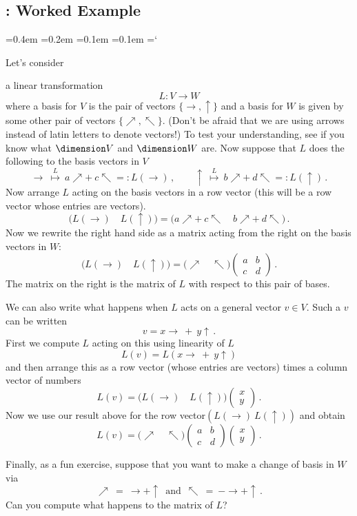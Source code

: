 
\subsection{\eigenTitle: Worked Example}

{\ttfamily
{}\font=0.4em
\font=0.2em
\font=0.1em
\font=0.1em
\hyphenchar\font=`\-


\hypertarget{scripts_eigenvalseigenvects_matrix}{Let's consider} a linear transformation 
\[L:V\longrightarrow W\]
where a basis for $V$ is the pair of vectors $\{\to,\uparrow\}$
and a basis for $W$ is given by some other pair of vectors $\{\nearrow,\nwarrow\}$. (Don't be afraid that we are using arrows instead of latin letters to denote vectors!) To test your understanding, see if you know what $\dimension V$ and $\dimension W$ are. Now suppose that $L$ does the 
following to the basis vectors in $V$
\[
\to \ \stackrel{L}\mapsto\  a\nearrow + \ c\nwarrow =: L(\to)\, ,\qquad \uparrow \ \stackrel{L}\mapsto \ 
b\nearrow +\  d\nwarrow=: L(\uparrow)\, .
\]
Now arrange $L$ acting on the basis vectors in a row vector (this will be a row vector whose entries are vectors).
\[
\big(L(\to)\quad L(\uparrow)\big)
=
\big(a\nearrow + \ c\nwarrow\quad b\nearrow + \ d\nwarrow\big)\, .
\]
Now we rewrite the right hand side as a matrix acting from the right on the basis vectors in $W$:
\[
\big(L(\to)\quad L(\uparrow)\big)
=
\big(\nearrow\quad \nwarrow\big)
\begin{pmatrix}
a&b\\c&d
\end{pmatrix}\, .
\]
The matrix on the right is the matrix of $L$ with respect to this pair of bases.

We can also write what happens when $L$ acts on a general vector $v\in V$. Such a $v$ can be written
\[
v=x \to \ + \ y \uparrow\, .
\]
First we compute $L$ acting on this using linearity of $L$
\[
L(v) = L(x \to \ + \ y \uparrow)
\]
and then arrange this as a row vector (whose entries are vectors) times a column vector of numbers
\[
L(v) = \big(L(\to)\quad  L(\uparrow)\big)\begin{pmatrix}x\\y\end{pmatrix}\, .
\] 
Now we use our result above for the row vector$(L(\to)\ L(\uparrow))$
and obtain
\[
L(v) = \big(\nearrow\quad \nwarrow\big)
\begin{pmatrix}
a&b\\c&d
\end{pmatrix}
\begin{pmatrix}x\\y\end{pmatrix}\, .
\]

Finally, as a fun exercise, suppose that you want to make a change of basis in $W$ via
\[
\nearrow \ = \ \to + \uparrow\, \mbox{ and } \, \nwarrow\ =\  -\to + \uparrow\, .
\]
Can you compute what happens to the matrix of $L$?

} %

\newpage
